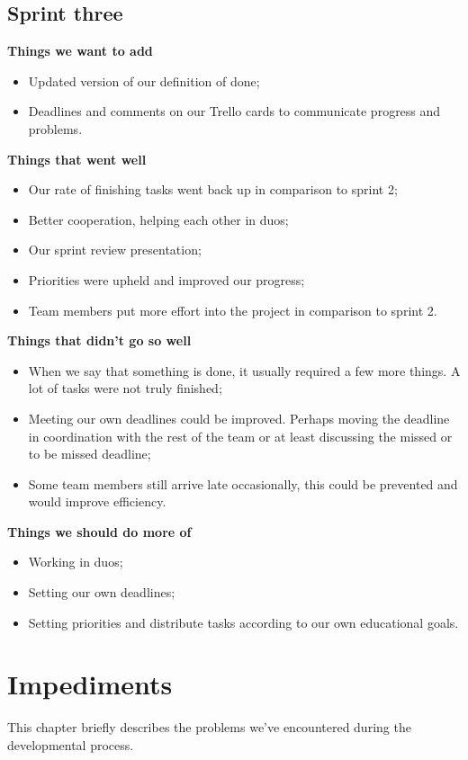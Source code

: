 \documentclass[12pt]{article}
\begin{document}
	\subsection{Sprint three} 
		\textbf{Things we want to add}
	\begin{itemize}
		\item Updated version of our definition of done;
		\item Deadlines and comments on our Trello cards to communicate progress and problems. 
	\end{itemize}
	\textbf{Things that went well}
	\begin{itemize}
		\item Our rate of finishing tasks went back up in comparison to sprint 2;
		\item Better cooperation, helping each other in duos;
		\item Our sprint review presentation;
		\item Priorities were upheld and improved our progress;
		\item Team members put more effort into the project in comparison to sprint 2.
	\end{itemize}
	\textbf{Things that didn't go so well}
	\begin{itemize}
		\item When we say that something is done, it usually required a few more things. A lot of tasks were not truly finished;
		\item Meeting our own deadlines could be improved. Perhaps moving the deadline in coordination with the rest of the team or at least discussing the missed or to be missed deadline;
		\item Some team members still arrive late occasionally, this could be prevented and would improve efficiency. 
	\end{itemize}
	\textbf{Things we should do more of}
	\begin{itemize}
		\item Working in duos;
		\item Setting our own deadlines;
		\item Setting priorities and distribute tasks according to our own educational goals.
	\end{itemize}
	\section{Impediments}
	This chapter briefly describes the problems we've encountered during the developmental process.
\end{document}
